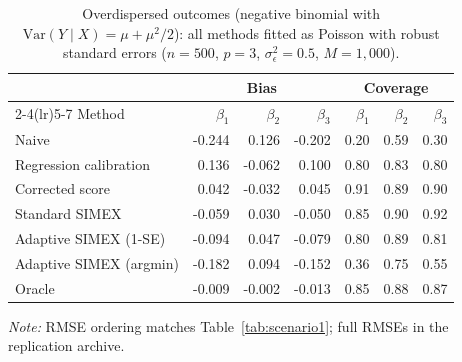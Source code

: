\begin{table}[t]
\centering
\footnotesize
\caption{Overdispersed outcomes (negative binomial with
$\mathrm{Var}(Y\mid X)=\mu+\mu^2/2$): all methods fitted as
Poisson with robust standard errors ($n=500$, $p=3$,
$\sigma^2_\epsilon=0.5$, $M=1{,}000$).}
\label{tab:nb}
\begin{tabular}{l rrr rrr}
\toprule
& \multicolumn{3}{c}{Bias} & \multicolumn{3}{c}{Coverage} \\
\cmidrule(lr){2-4}\cmidrule(lr){5-7}
Method & $\beta_1$ & $\beta_2$ & $\beta_3$ & $\beta_1$ & $\beta_2$ & $\beta_3$ \\
\midrule
Naive & -0.244 & 0.126 & -0.202 & 0.20 & 0.59 & 0.30 \\
Regression calibration & 0.136 & -0.062 & 0.100 & 0.80 & 0.83 & 0.80 \\
Corrected score & 0.042 & -0.032 & 0.045 & 0.91 & 0.89 & 0.90 \\
Standard SIMEX & -0.059 & 0.030 & -0.050 & 0.85 & 0.90 & 0.92 \\
Adaptive SIMEX (1-SE) & -0.094 & 0.047 & -0.079 & 0.80 & 0.89 & 0.81 \\
Adaptive SIMEX (argmin) & -0.182 & 0.094 & -0.152 & 0.36 & 0.75 & 0.55 \\
Oracle & -0.009 & -0.002 & -0.013 & 0.85 & 0.88 & 0.87 \\
\bottomrule
\end{tabular}
\par\footnotesize \emph{Note:} RMSE ordering matches
Table~\ref{tab:scenario1}; full RMSEs in the replication
archive.
\end{table}